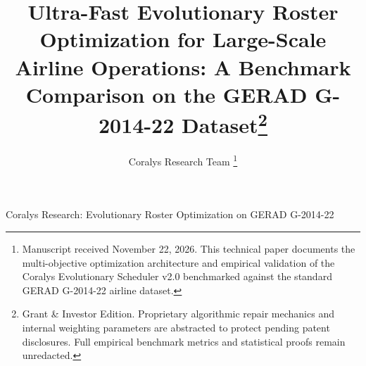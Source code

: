 \documentclass[journal]{IEEEtran}
\begin{document}
\title{Ultra-Fast Evolutionary Roster Optimization for Large-Scale Airline Operations: A Benchmark Comparison on the GERAD G-2014-22 Dataset\thanks{Grant \& Investor Edition. Proprietary algorithmic repair mechanics and internal weighting parameters are abstracted to protect pending patent disclosures. Full empirical benchmark metrics and statistical proofs remain unredacted.}}

\author{Coralys Research Team%
\thanks{Manuscript received November 22, 2026. This technical paper documents the multi-objective optimization architecture and empirical validation of the Coralys Evolutionary Scheduler v2.0 benchmarked against the standard GERAD G-2014-22 airline dataset.}}

%
{Coralys Research: Evolutionary Roster Optimization on GERAD G-2014-22}

\maketitle
\end{document}
